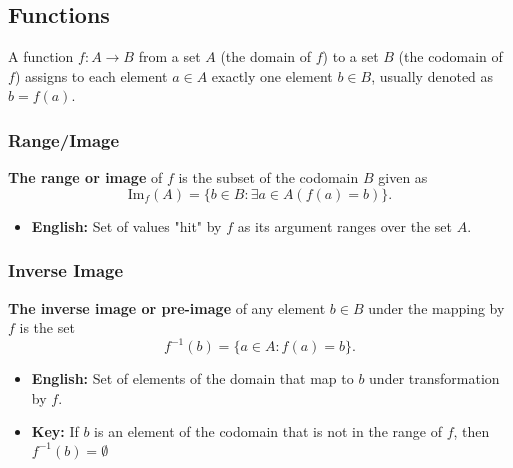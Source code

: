 \subsection{Functions}
\begin{definition}
    A function \( f: A \to B \) from a set \( A \) (the domain of \( f \)) to a set \( B \) (the codomain of \( f \)) assigns to each element \( a \in A \) exactly one element \( b \in B \), usually denoted as \( b = f(a) \).
\end{definition}

    \subsubsection{Range/Image}
    \begin{definition}
        \textbf{The range or image} of \( f \) is the subset of the codomain $B$ given as 
        \[
        \text{Im}_f(A) = \{ b \in B: \exists a \in A(f(a) = b) \}.
        \]
        \begin{itemize}
            \item \textbf{English:} Set of values "hit" by $f$ as its argument ranges over the set $A$.
        \end{itemize}
    \end{definition}

    \subsubsection{Inverse Image}
    \begin{definition}
        \textbf{The inverse image or pre-image} of any element \( b \in B \) under the mapping by \( f \) is the set 
        \[
        f^{-1}(b) = \{ a \in A : f(a) = b \}.
        \]
        \begin{itemize}
            \item \textbf{English:} Set of elements of the domain that map to $b$ under transformation by $f$.
            \item \textbf{Key:} If $b$ is an element of the codomain that is not in the range of $f$, then $f^{-1} (b) = \emptyset$
        \end{itemize}
    \end{definition}

